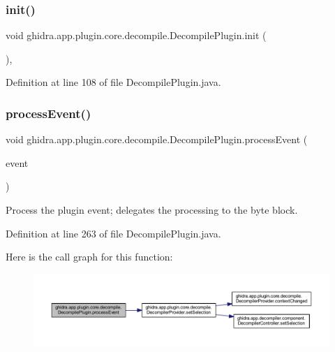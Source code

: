 \subsubsection{\texorpdfstring{init()}{init()}}
{\footnotesize\ttfamily void ghidra.\+app.\+plugin.\+core.\+decompile.\+Decompile\+Plugin.\+init (\begin{DoxyParamCaption}{ }\end{DoxyParamCaption})\hspace{0.3cm}{\ttfamily [inline]}, {\ttfamily [protected]}}



Definition at line 108 of file Decompile\+Plugin.\+java.

\mbox{\label{classghidra_1_1app_1_1plugin_1_1core_1_1decompile_1_1_decompile_plugin_a9d97e39f73e8cf926190eaa1551dffde}} 
\subsubsection{\texorpdfstring{processEvent()}{processEvent()}}
{\footnotesize\ttfamily void ghidra.\+app.\+plugin.\+core.\+decompile.\+Decompile\+Plugin.\+process\+Event (\begin{DoxyParamCaption}\item[{Plugin\+Event}]{event }\end{DoxyParamCaption})\hspace{0.3cm}{\ttfamily [inline]}}

Process the plugin event; delegates the processing to the byte block. 

Definition at line 263 of file Decompile\+Plugin.\+java.

Here is the call graph for this function\+:
\nopagebreak
\begin{figure}[H]
\begin{center}
\leavevmode
\includegraphics[width=350pt]{classghidra_1_1app_1_1plugin_1_1core_1_1decompile_1_1_decompile_plugin_a9d97e39f73e8cf926190eaa1551dffde_cgraph}
\end{center}
\end{figure}
\mbox{\label{classghidra_1_1app_1_1plugin_1_1core_1_1decompile_1_1_decompile_plugin_a60c3bde2ea8b6488190f86e0f9da432b}} 
